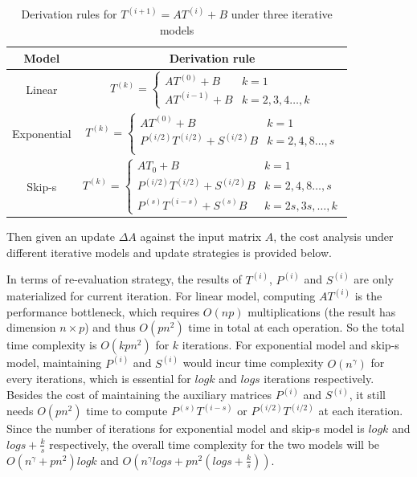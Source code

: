 \begin{table}[]
    \centering
    \begin{tabular}{|c|c|}\hline
        Model & Derivation rule \\ \hline
        Linear & $T^{(k)}=
\begin{cases}
AT^{(0)} + B& k=1\\
AT^{(i-1)} + B & k=2,3,4\dots,k
\end{cases}$\\ \hline
        Exponential & $T^{(k)}=
\begin{cases}
AT^{(0)} + B& k=1\\
P^{(i/2)}T^{(i/2)} + S^{(i/2)}B & k=2,4,8\dots,s\\
\end{cases}$\\ \hline
        Skip-s &$T^{(k)}=
\begin{cases}
AT_0 + B& k=1\\
P^{(i/2)}T^{(i/2)} + S^{(i/2)}B & k=2,4,8\dots,s\\
P^{(s)}T^{(i-s)} + S^{(s)}B & k = 2s, 3s, \dots, k
\end{cases}$\\ \hline
    \end{tabular}
    \caption{Derivation rules for $T^{(i+1)} = AT^{(i)} + B$ under three iterative models}
    \label{tab:derivation_rule}
\end{table}

Then given an update $\Delta A$ against the input matrix $A$, the cost analysis under different iterative models and update strategies is provided below.

In terms of re-evaluation strategy, the results of $T^{(i)}$, $P^{(i)}$ and $S^{(i)}$ are only materialized for current iteration. For linear model, computing $AT^{(i)}$ is the performance bottleneck, which requires $O(np)$ multiplications  (the result has dimension $n \times p$) and thus $O(pn^2)$ time in total at each operation. So the total time complexity is $O(kpn^2)$ for $k$ iterations. For exponential model and skip-s model, maintaining $P^{(i)}$ and $S^{(i)}$ would incur time complexity $O(n^{\gamma})$ for every iterations, which is essential for $logk$ and $logs$ iterations respectively. Besides the cost of maintaining the auxiliary matrices $P^{(i)}$ and $S^{(i)}$, it still needs $O(pn^2)$ time to compute $P^{(s)}T^{(i-s)}$ or $P^{(i/2)}T^{(i/2)}$ at each iteration. Since the number of iterations for exponential model and skip-s model is $logk$ and $logs + \frac{k}{s}$ respectively, the overall time complexity for the two models will be $O(n^{\gamma} + pn^2)logk$ and $O(n^{\gamma}logs + pn^2(logs+ \frac{k}{s}))$.

